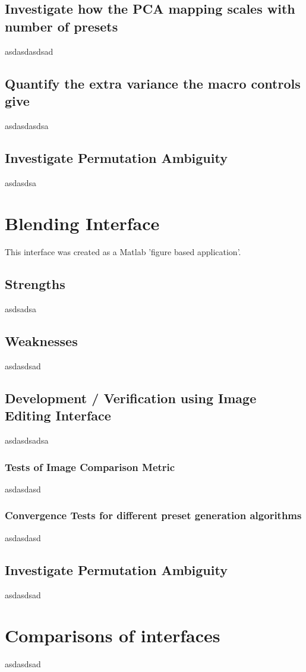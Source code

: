\documentclass[11pt, oneside]{report}   	%
\begin{document}
\subsection{Investigate how the PCA mapping scales with number of presets}
asdasdasdsad
\subsection{Quantify the extra variance the macro controls give}
asdasdasdsa
\subsection{Investigate Permutation Ambiguity}
asdasdsa

\section{Blending Interface}
This interface was created as a Matlab 'figure based application'.
\subsection{Strengths}
asdsadsa
\subsection{Weaknesses}
asdasdsad
\subsection{Development / Verification using Image Editing Interface}
asdasdsadsa
\subsubsection{Tests of Image Comparison Metric}
asdasdasd
\subsubsection{Convergence Tests for different preset generation algorithms}
asdasdasd
\subsection{Investigate Permutation Ambiguity}
asdasdsad

\section{Comparisons of interfaces}
asdasdsad
\end{document}
